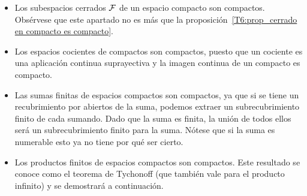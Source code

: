 \begin{itemize}
	\item Los subespacios cerrados $\mathcal{F}$ de un espacio compacto son compactos. Obsérvese que este apartado no es más que la proposición~\ref{T6:prop_cerrado en compacto es compacto}.
	
	\item Los espacios cocientes de compactos son compactos, puesto que un cociente es una aplicación continua suprayectiva y la imagen continua de un compacto es compacto. 
	
	\item Las sumas finitas de espacios compactos son compactos, ya que si se tiene un recubrimiento por abiertos de la suma, podemos extraer un subrecubrimiento finito de cada sumando. Dado que la suma es finita, la unión de todos ellos será un subrecubrimiento  finito para la suma. Nótese que si la suma es numerable esto ya no tiene por qué ser cierto. 
	\item Los productos finitos de espacios compactos son compactos. Este resultado se conoce como el teorema de Tychonoff (que también vale para el producto infinito) y se demostrará a continuación. 
\end{itemize}

